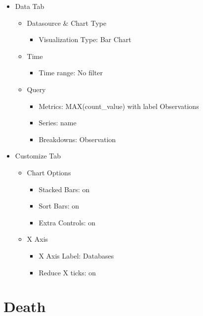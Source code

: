 \documentclass[
]{book}
\providecommand{\tightlist}{%
  \setlength{\itemsep}{0pt}\setlength{\parskip}{0pt}}
\begin{document}
\begin{itemize}
\tightlist
\item
  Data Tab

  \begin{itemize}
  \tightlist
  \item
    Datasource \& Chart Type

    \begin{itemize}
    \tightlist
    \item
      Visualization Type: Bar Chart
    \end{itemize}
  \item
    Time

    \begin{itemize}
    \tightlist
    \item
      Time range: No filter
    \end{itemize}
  \item
    Query

    \begin{itemize}
    \tightlist
    \item
      Metrics: MAX(count\_value) with label Observations
    \item
      Series: name
    \item
      Breakdowns: Observation
    \end{itemize}
  \end{itemize}
\item
  Customize Tab

  \begin{itemize}
  \tightlist
  \item
    Chart Options

    \begin{itemize}
    \tightlist
    \item
      Stacked Bars: on
    \item
      Sort Bars: on
    \item
      Extra Controls: on
    \end{itemize}
  \item
    X Axis

    \begin{itemize}
    \tightlist
    \item
      X Axis Label: Databases
    \item
      Reduce X ticks: on
    \end{itemize}
  \end{itemize}
\end{itemize}

\hypertarget{death}{%
\section{Death}\label{death}}
\end{document}
